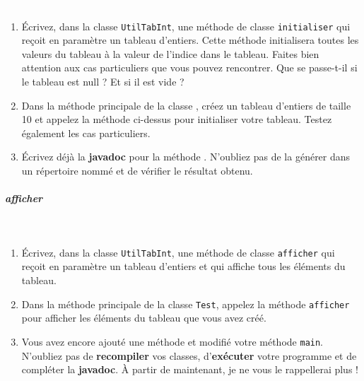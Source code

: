 \documentclass[11pt,a4paper]{article}
\begin{document}
					\textcolor{white}{.} \par
				
            \par
        
					\begin{enumerate}
				
			\item  
					\'Ecrivez, dans la classe 
					\verb|UtilTabInt|, 
					une m\'ethode de classe 
					\verb|initialiser|    
					qui re\c coit en param\`etre un tableau d'entiers. 
					Cette m\'ethode initialisera toutes les valeurs 
					du tableau \`a la valeur de l'indice dans le tableau.
					Faites bien attention
					aux cas particuliers que vous pouvez rencontrer. 
					Que se passe-t-il si le tableau est null ? 
					Et si il est vide ?
				
			\item  
					Dans la m\'ethode principale de la classe 
					\verb@Test@, 
					cr\'eez un tableau d'entiers de taille 10
					et appelez la m\'ethode 
					\verb@initialiser@ 
					ci-dessus pour initialiser votre tableau.
					Testez \'egalement les cas particuliers.
				
			\item  
					\'Ecrivez d\'ej\`a la 
					\textbf{javadoc} 
					pour la m\'ethode 
					\verb@initialiser@.
					N'oubliez pas de la g\'en\'erer dans un r\'epertoire 
					nomm\'e \verb@javadoc@ 
					et de v\'erifier le r\'esultat obtenu.
				
					\end{enumerate}
				
			
		\subparagraph{afficher} 
		
					\textcolor{white}{.} \par
				
            \par
        
					\begin{enumerate}
				
			\item 
					\'Ecrivez, dans la classe \verb|UtilTabInt|, 
					une m\'ethode de classe \verb|afficher| 
					qui re\c coit en param\`etre un tableau d'entiers et qui affiche tous les \'el\'ements du tableau.
				
			\item  
					Dans la m\'ethode principale de la classe 
					\verb|Test|, 
					appelez la m\'ethode \verb|afficher| 
					pour afficher les \'el\'ements du tableau que vous avez cr\'e\'e.
				
			\item  
					Vous avez encore ajout\'e une m\'ethode et modifi\'e votre m\'ethode \verb|main|. 
					N'oubliez pas de \textbf{recompiler} vos classes,
					d'\textbf{ex\'ecuter} votre programme
					et de compl\'eter la \textbf{javadoc}.
					\`A partir de maintenant, je ne vous le rappellerai plus !
					
					\end{enumerate}
				
\end{document}
